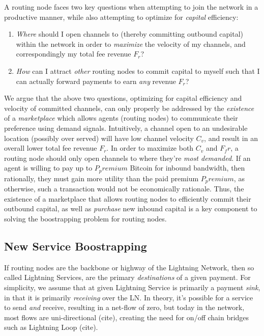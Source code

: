 \documentclass[12pt,a4paper]{article}
\theoremstyle{definition}
\begin{document}
A routing node faces two key questions when attempting to join the network in a
productive manner, while also attempting to optimize for \emph{capital}
efficiency:

\begin{enumerate}
        \item \emph{Where} should I open channels to (thereby committing
            outbound capital) within the network in order to \emph{maximize}
            the velocity of my channels, and correspondingly my total fee
            revenue $F_r$?

        \item \emph{How} can I attract \emph{other} routing nodes to commit
            capital to myself such that I can actually forward payments to earn
            \emph{any} revenue $F_r$?
\end{enumerate}

We argue that the above two questions, optimizing for capital efficiency and
velocity of committed channels, can only properly be addressed by the
\emph{existence} of a \emph{marketplace} which allows agents (routing nodes) to
communicate their preference using demand signals. Intuitively, a channel open
to an undesirable location (possibly over served) will have low channel
velocity $C_{v}$, and result in an overall lower total fee revenue $F_r$. In
order to maximize both $C_v$ and $F_fr$, a routing node should only open
channels to where they're \emph{most demanded}. If an agent is willing to pay
up to $P_premium$ Bitcoin for inbound bandwidth, then rationally, they must gain
more utility than the paid premium $P_premium$, as otherwise, such a
transaction would not be economically rationale. Thus, the existence of a
marketplace that allows routing nodes to efficiently commit their outbound
capital, as well as \emph{purchase} new inbound capital is a key component to
solving the boostrapping problem for routing nodes.


\subsection{New Service Boostrapping}

If routing nodes are the backbone or highway of the Lightning Network, then
so called Lightning Services, are the primary \emph{destinations} of a given
payment. For simplicity, we assume that at given Lightning Service is primarily
a payment \emph{sink}, in that it is primarily \emph{receiving} over the
LN. In theory, it's possible for a service to send \emph{and} receive,
resulting in a net-flow of zero, but today in the network, most flows are
uni-directional (cite), creating the need for on/off chain bridges such as
Lightning Loop (cite).
\end{document}
